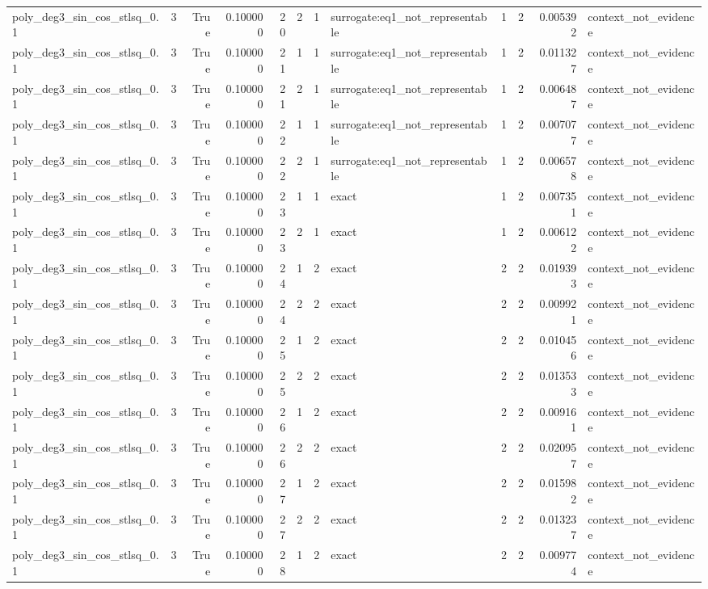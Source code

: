 \begin{tabular}{lrrrrrrlrrrl}
poly\_deg3\_sin\_cos\_stlsq\_0.1 & 3 & True & 0.100000 & 20 & 2 & 1 & surrogate:eq1\_not\_representable & 1 & 2 & 0.005392 & context\_not\_evidence \\
poly\_deg3\_sin\_cos\_stlsq\_0.1 & 3 & True & 0.100000 & 21 & 1 & 1 & surrogate:eq1\_not\_representable & 1 & 2 & 0.011327 & context\_not\_evidence \\
poly\_deg3\_sin\_cos\_stlsq\_0.1 & 3 & True & 0.100000 & 21 & 2 & 1 & surrogate:eq1\_not\_representable & 1 & 2 & 0.006487 & context\_not\_evidence \\
poly\_deg3\_sin\_cos\_stlsq\_0.1 & 3 & True & 0.100000 & 22 & 1 & 1 & surrogate:eq1\_not\_representable & 1 & 2 & 0.007077 & context\_not\_evidence \\
poly\_deg3\_sin\_cos\_stlsq\_0.1 & 3 & True & 0.100000 & 22 & 2 & 1 & surrogate:eq1\_not\_representable & 1 & 2 & 0.006578 & context\_not\_evidence \\
poly\_deg3\_sin\_cos\_stlsq\_0.1 & 3 & True & 0.100000 & 23 & 1 & 1 & exact & 1 & 2 & 0.007351 & context\_not\_evidence \\
poly\_deg3\_sin\_cos\_stlsq\_0.1 & 3 & True & 0.100000 & 23 & 2 & 1 & exact & 1 & 2 & 0.006122 & context\_not\_evidence \\
poly\_deg3\_sin\_cos\_stlsq\_0.1 & 3 & True & 0.100000 & 24 & 1 & 2 & exact & 2 & 2 & 0.019393 & context\_not\_evidence \\
poly\_deg3\_sin\_cos\_stlsq\_0.1 & 3 & True & 0.100000 & 24 & 2 & 2 & exact & 2 & 2 & 0.009921 & context\_not\_evidence \\
poly\_deg3\_sin\_cos\_stlsq\_0.1 & 3 & True & 0.100000 & 25 & 1 & 2 & exact & 2 & 2 & 0.010456 & context\_not\_evidence \\
poly\_deg3\_sin\_cos\_stlsq\_0.1 & 3 & True & 0.100000 & 25 & 2 & 2 & exact & 2 & 2 & 0.013533 & context\_not\_evidence \\
poly\_deg3\_sin\_cos\_stlsq\_0.1 & 3 & True & 0.100000 & 26 & 1 & 2 & exact & 2 & 2 & 0.009161 & context\_not\_evidence \\
poly\_deg3\_sin\_cos\_stlsq\_0.1 & 3 & True & 0.100000 & 26 & 2 & 2 & exact & 2 & 2 & 0.020957 & context\_not\_evidence \\
poly\_deg3\_sin\_cos\_stlsq\_0.1 & 3 & True & 0.100000 & 27 & 1 & 2 & exact & 2 & 2 & 0.015982 & context\_not\_evidence \\
poly\_deg3\_sin\_cos\_stlsq\_0.1 & 3 & True & 0.100000 & 27 & 2 & 2 & exact & 2 & 2 & 0.013237 & context\_not\_evidence \\
poly\_deg3\_sin\_cos\_stlsq\_0.1 & 3 & True & 0.100000 & 28 & 1 & 2 & exact & 2 & 2 & 0.009774 & context\_not\_evidence \\

\end{tabular}
